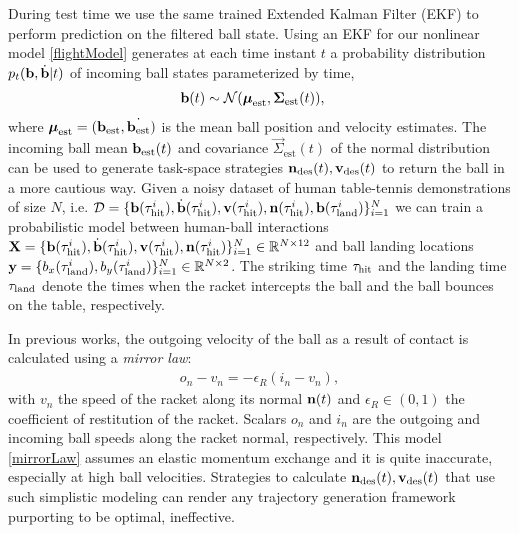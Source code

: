During test time we use the same trained Extended Kalman Filter (EKF) to perform prediction on the filtered ball state. 
Using an EKF for our nonlinear model \eqref{flightModel} generates at each time instant $t$ a probability distribution $p_t(\boldsymbol{\mathrm{b}},\dot{\boldsymbol{\mathrm{b}}}|t)$ of incoming ball states parameterized by time, 
%
\begin{align}
\boldsymbol{\mathrm{b}}(t) &\sim \mathcal{N}(\boldsymbol{\mathrm{\mu}}_{\mathrm{est}},\boldsymbol{\mathrm{\Sigma}}_{\mathrm{est}}(t)),
\label{ballProcess}
\end{align}
%
\noindent where $\boldsymbol{\mathrm{\mu}}_{\mathrm{est}} = (\boldsymbol{\mathrm{b}}_{\mathrm{est}},\dot{\boldsymbol{\mathrm{b}}_{\mathrm{est}}})$ is the mean ball position and velocity estimates.
%
The incoming ball mean $\boldsymbol{\mathrm{b}}_{\mathrm{est}}(t)$ and covariance $\vec{\Sigma}_{\mathrm{est}}(t)$ of the normal distribution can be used to generate task-space strategies $\boldsymbol{\mathrm{n}}_{\mathrm{des}}(t), \boldsymbol{\mathrm{v}}_{\mathrm{des}}(t)$ to return the ball in a more cautious way. Given a noisy dataset of human table-tennis demonstrations of size $N$, i.e. $\mathcal{D} = \{\boldsymbol{\mathrm{b}}(\tau_{\mathrm{hit}}^i), \dot{\boldsymbol{\mathrm{b}}}(\tau_{\mathrm{hit}}^i), \boldsymbol{\mathrm{v}}(\tau_{\mathrm{hit}}^i), \boldsymbol{\mathrm{n}}(\tau_{\mathrm{hit}}^i), \boldsymbol{\mathrm{b}}(\tau_{\mathrm{land}}^i)\}_{i=1}^{N}$ we can train a probabilistic model between human-ball interactions $\boldsymbol{\mathrm{X}} = \{\boldsymbol{\mathrm{b}}(\tau_{\mathrm{hit}}^i), \dot{\boldsymbol{\mathrm{b}}}(\tau_{\mathrm{hit}}^i), \boldsymbol{\mathrm{v}}(\tau_{\mathrm{hit}}^i), \boldsymbol{\mathrm{n}}(\tau_{\mathrm{hit}}^i)\}_{i=1}^{N} \in \mathbb{R}^{N \times 12}$ and ball landing locations $\boldsymbol{\mathrm{y}} = \{b_x(\tau_{\mathrm{land}}^i), b_y(\tau_{\mathrm{land}}^i)\}_{i=1}^{N} \in \mathbb{R}^{N \times 2}$. The striking time $\tau_{\mathrm{hit}}$ and the landing time $\tau_{\mathrm{land}}$ denote the times when the racket intercepts the ball and the ball bounces on the table, respectively.  	

In previous works, the outgoing velocity of the ball as a result of contact is calculated using a \emph{mirror law}: 
%
\begin{align}
o_{n} - v_{n} = -\epsilon_{R} (i_{n} - v_{n}),
\label{mirrorLaw}
\end{align}
%
\noindent with $v_{n}$ the speed of the racket along its normal $\boldsymbol{\mathrm{n}}(t)$ and $\epsilon_{R} \in (0,1)$ the coefficient of restitution of the racket. Scalars $o_{n}$ and $i_{n}$ are the outgoing and incoming ball speeds along the racket normal, respectively. This model \eqref{mirrorLaw} assumes an elastic momentum exchange and it is quite inaccurate, especially at high ball velocities. Strategies to calculate $\boldsymbol{\mathrm{n}}_{\mathrm{des}}(t), \boldsymbol{\mathrm{v}}_{\mathrm{des}}(t)$ that use such simplistic modeling can render any trajectory generation framework purporting to be optimal, ineffective.


